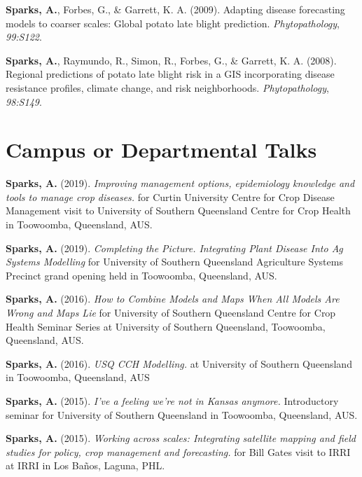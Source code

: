 \documentclass[11pt, a4paper]{awesome-cv}
\begin{document}
\leavevmode\hypertarget{ref-Sparks2009}{}%
\textbf{Sparks, A.}, Forbes, G., \& Garrett, K. A. (2009). Adapting disease forecasting models to coarser scales: Global potato late blight prediction. \emph{Phytopathology}, \emph{99:S122}.

\leavevmode\hypertarget{ref-Sparks2008b}{}%
\textbf{Sparks, A.}, Raymundo, R., Simon, R., Forbes, G., \& Garrett, K. A. (2008). Regional predictions of potato late blight risk in a GIS incorporating disease resistance profiles, climate change, and risk neighborhoods. \emph{Phytopathology}, \emph{98:S149}.

\endgroup

\hypertarget{campus-or-departmental-talks}{%
\section{Campus or Departmental Talks}\label{campus-or-departmental-talks}}

\begingroup
\setlength{\parindent}{-0.5in}
\setlength{\leftskip}{0.5in}

\textbf{Sparks, A.} (2019). \emph{Improving management options, epidemiology knowledge and tools to manage crop diseases.} for Curtin University Centre for Crop Disease Management visit to University of Southern Queensland Centre for Crop Health in Toowoomba, Queensland, AUS.

\textbf{Sparks, A.} (2019). \emph{Completing the Picture. Integrating Plant Disease Into Ag Systems Modelling} for University of Southern Queensland Agriculture Systems Precinct grand opening held in Toowoomba, Queensland, AUS.

\textbf{Sparks, A.} (2016). \emph{How to Combine Models and Maps When All Models Are Wrong and Maps Lie} for University of Southern Queensland Centre for Crop Health Seminar Series at University of Southern Queensland, Toowoomba, Queensland, AUS.

\textbf{Sparks, A.} (2016). \emph{USQ CCH Modelling.} at University of Southern Queensland in Toowoomba, Queensland, AUS

\textbf{Sparks, A.} (2015). \emph{I've a feeling we're not in Kansas anymore.} Introductory seminar for University of Southern Queensland in Toowoomba, Queensland, AUS.

\textbf{Sparks, A.} (2015). \emph{Working across scales: Integrating satellite mapping and field studies for policy, crop management and forecasting.} for Bill Gates visit to IRRI at IRRI in Los Baños, Laguna, PHL.
\end{document}
